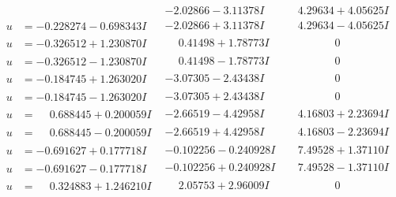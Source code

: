 \documentclass[1p]{elsarticle_modified}
\theoremstyle{definition}
\begin{document}
$$\begin{array}{c|c|c}
 & -2.02866 - 3.11378 I & \phantom{-}4.29634 + 4.05625 I \\ \hline\begin{aligned}
u &= -0.228274 - 0.698343 I\end{aligned}
 & -2.02866 + 3.11378 I & \phantom{-}4.29634 - 4.05625 I \\ \hline\begin{aligned}
u &= -0.326512 + 1.230870 I\end{aligned}
 & \phantom{-}0.41498 + 1.78773 I & \phantom{-0.000000 } 0 \\ \hline\begin{aligned}
u &= -0.326512 - 1.230870 I\end{aligned}
 & \phantom{-}0.41498 - 1.78773 I & \phantom{-0.000000 } 0 \\ \hline\begin{aligned}
u &= -0.184745 + 1.263020 I\end{aligned}
 & -3.07305 - 2.43438 I & \phantom{-0.000000 } 0 \\ \hline\begin{aligned}
u &= -0.184745 - 1.263020 I\end{aligned}
 & -3.07305 + 2.43438 I & \phantom{-0.000000 } 0 \\ \hline\begin{aligned}
u &= \phantom{-}0.688445 + 0.200059 I\end{aligned}
 & -2.66519 - 4.42958 I & \phantom{-}4.16803 + 2.23694 I \\ \hline\begin{aligned}
u &= \phantom{-}0.688445 - 0.200059 I\end{aligned}
 & -2.66519 + 4.42958 I & \phantom{-}4.16803 - 2.23694 I \\ \hline\begin{aligned}
u &= -0.691627 + 0.177718 I\end{aligned}
 & -0.102256 - 0.240928 I & \phantom{-}7.49528 + 1.37110 I \\ \hline\begin{aligned}
u &= -0.691627 - 0.177718 I\end{aligned}
 & -0.102256 + 0.240928 I & \phantom{-}7.49528 - 1.37110 I \\ \hline\begin{aligned}
u &= \phantom{-}0.324883 + 1.246210 I\end{aligned}
 & \phantom{-}2.05753 + 2.96009 I & \phantom{-0.000000 } 0 \\ \hline\begin{aligned}

\end{aligned}
\end{array}$$
\end{document}
